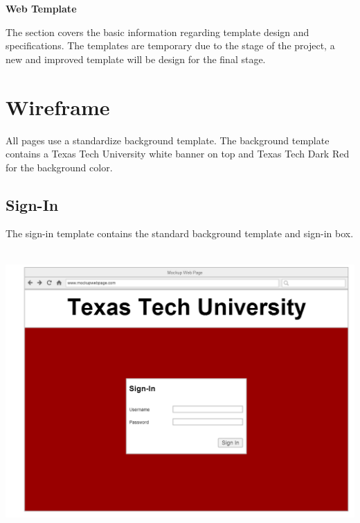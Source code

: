 \documentclass[12pt]{exam}
\begin{document}
	
	\begin{center}
			\LARGE{\textbf{Web Template}}
	\end{center}
	The section covers the basic information regarding template design and specifications. The templates are temporary due to the stage of the project, a new and improved template will be design for the final stage. 
\section{Wireframe}
All pages use a standardize background template. The background template contains a Texas Tech University white banner on top and Texas Tech Dark Red for the background color.
\subsection{Sign-In}
The sign-in template contains the standard background template and sign-in box.
\begin{center}
\emph{\\}\includegraphics[scale=0.20]{signin.PNG}\\
\end{center}
	
\end{document}
